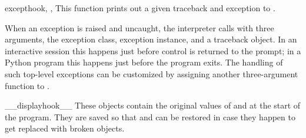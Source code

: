 \begin{funcdesc}{excepthook}{, , }
  This function prints out a given traceback and exception to
  .

  When an exception is raised and uncaught, the interpreter calls
   with three arguments, the exception class,
  exception instance, and a traceback object.  In an interactive
  session this happens just before control is returned to the prompt;
  in a Python program this happens just before the program exits.  The
  handling of such top-level exceptions can be customized by assigning
  another three-argument function to .
\end{funcdesc}

\begin{datadesc}{__displayhook__}
  These objects contain the original values of  and
   at the start of the program.  They are saved so
  that  and  can be restored in
  case they happen to get replaced with broken objects.
\end{datadesc}

